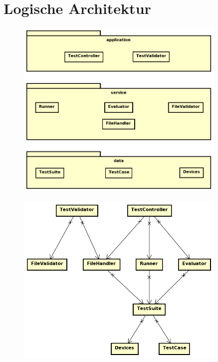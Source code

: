 \documentclass[a4,12pt]{scrartcl}
\begin{document}
\section{Logische Architektur}
\begin{figure} [H]
	\begin{center}
	\includegraphics[width=0.90\textwidth]{./pictures/architektur.png}
	\label{Bild Referenz}
	\end{center}
\end{figure}
\begin{figure} [H]
	\begin{center}
	\includegraphics[width=0.90\textwidth]{./pictures/dependence_diagram.png}
	\label{Bild Referenz}
	\end{center}
\end{figure}
\end{document}
